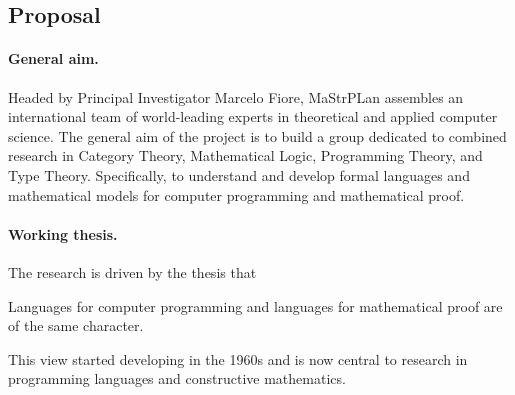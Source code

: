 \documentclass[11pt,twocolumn]{article}
\newenvironment{myquote}
  {\begin{list}{}
  {\setlength{\topsep}{2pt}
   \setlength{\partopsep}{2pt}
   \setlength{\itemsep}{2.5pt}
   \setlength{\parsep}{2.5pt}
   \setlength{\rightmargin}{1em}
   \setlength{\leftmargin}{1em}
   \setlength{\labelwidth}{.5em}}}
  {\end{list}}
\newcommand{\erc}{{\small\sf MaStrPLan}}
\newcommand{\eg}{\emph{eg.}}
\begin{document}
\clearpage
{}

\subsection{Proposal}

\paragraph*{General aim.}

Headed by Principal Investigator Marcelo Fiore, {\erc} assembles an
international team of world-leading experts in theoretical and applied
computer science.  The general aim of the project is to build a group
dedicated to combined research in Category Theory, Mathematical Logic,
Programming Theory, and Type Theory.  Specifically, to understand and
develop formal languages and mathematical models for computer programming
and mathematical proof. 

\paragraph*{Working thesis.}

The research is driven by the thesis that
\begin{myquote}
\item
Languages 
for computer programming
and languages 
for mathematical proof 
are of the same character.
\end{myquote}
This view %
started developing in the 1960s %
and is now central to research in programming languages and constructive
mathematics.
\end{document}
